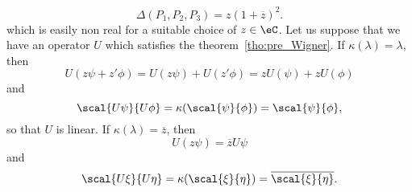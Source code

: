 \[
	\Delta(P_1,P_2,P_3)=z(1+\overline{z})^2.
\]
which is easily non real for a suitable choice of $z\in\eC$. Let us suppose that we have an operator $U$ which satisfies the theorem~\ref{tho:pre_Wigner}. If $\kappa(\lambda)=\lambda$, then
\begin{equation}
	U(z\psi+z'\phi)=U(z\psi)+U(z'\phi)
	=zU(\psi)+zU(\phi)
\end{equation}
and
\begin{equation}
	\scal{U\psi}{U\phi}=\kappa(\scal{\psi}{\phi})
	=\scal{\psi}{\phi},
\end{equation}
so that $U$ is linear. If $\kappa(\lambda)=\overline{z}$, then
\begin{equation}
	U(z\psi)=\overline{z}U\psi
\end{equation}
and
\begin{equation}
	\scal{U\xi}{U\eta}=\kappa(\scal{\xi}{\eta})
	=\overline{\scal{\xi}{\eta}}.
\end{equation}


